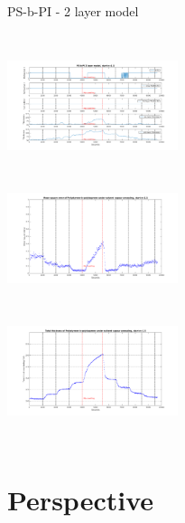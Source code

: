 \documentclass[10pt]{beamer}
\begin{document}
\begin{frame}{PS-b-PI - 2 layer model}
\begin{columns}[t]
	\centering
	\includegraphics[width=5cm,height=3.5cm]{Results_2layer_PSbPI_n15.png}\\
	\centering
	\includegraphics[width=5cm,height=4cm]{MSE_2layer_PSbPI_n15.png}\\
	\includegraphics[width=5cm,height=3.5cm]{total_thickness_2layer_PSbPI_n15.png}
\end{columns}
\end{frame}
	
	\section{Perspective}
\end{document}
